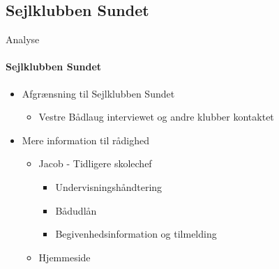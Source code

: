 \subsection{Sejlklubben Sundet}
\begin{frame}{Analyse}
\framesubtitle{Sejlklubben Sundet}
	\begin{itemize}
	\item Afgrænsning til Sejlklubben Sundet
			\begin{itemize}
			\item Vestre Bådlaug interviewet og andre klubber kontaktet
			\end{itemize}
	\item Mere information til rådighed
			\begin{itemize}
			\item Jacob - Tidligere skolechef
				\begin{itemize}
				\item Undervisningshåndtering
				\item Bådudlån
				\item Begivenhedsinformation og tilmelding
				\end{itemize}
			\item Hjemmeside
			\end{itemize}	
	\end{itemize}
	
\end{frame}